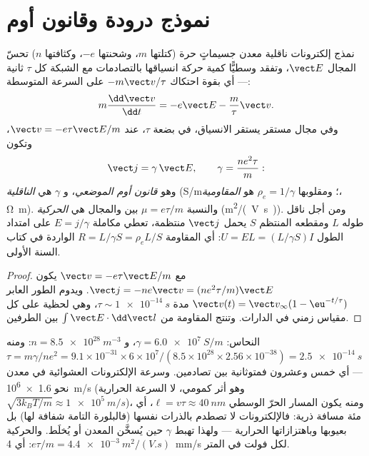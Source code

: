 \section{نموذج درودة وقانون أوم}

\begin{proposition}\label{prop:b2:charges-currents-conduction:drude}
نمذج إلكترونات ناقلية معدن جسيماتٍ حرة (كتلتها $m$،
وشحنتها $-e$، وكثافتها $n$) تحسّ المجال $\vect E$، وتفقد وسطيًّا
كمية حركة انسياقها بالتصادمات مع الشبكة كل $\tau$
ثانية --- أي بقوة احتكاك $-m\vect v/\tau$ على السرعة المتوسطة:
\[
m\frac{\dd\vect v}{\dd t} = -e\vect E - \frac m\tau\vect v .
\]
وفي مجال مستقر يستقر الانسياق، في بضعة $\tau$، عند $\vect v = -e\tau
\vect E/m$، وتكون 
\[
\vect j = \gamma\,\vect E , \qquad \gamma = \frac{ne^2\tau}{m} :
\]
وهو \emph{قانون أوم الموضعي}، و $\gamma$ هي \emph{الناقلية}
(\unit{S/m}؛ ومقلوبها $\rho_e = 1/\gamma$ هو \emph{المقاومية}،
\unit{\ohm.m}). والنسبة $\mu = e\tau/m$ بين  والمجال هي
\emph{الحركية} (\unit{m^2/(V.s)}). ومن أجل ناقل طوله $L$
ومقطعه المنتظم $S$ يحمل $\vect j$ منتظمة، تعطي مكاملة $E = j/\gamma$
على امتداد الطول $U = EL = (L/\gamma S)I$: أي المقاومة $R = L/\gamma S
= \rho_eL/S$ الواردة في كتاب السنة الأولى.
\end{proposition}

\begin{proof}
مع $\vect v = -e\tau\vect E/m$ يكون $\vect j = -ne\vect v = (ne^2\tau/m)\vect E$. ويدوم
الطور العابر $\vect v(t) = \vect v_\infty(1 - \eu^{-t/\tau})$ مدة $\tau \sim
\qty{1e-14}{s}$، وهي لحظية على كل مقياس زمني في الدارات. وتنتج المقاومة
من $\int\vect E\cdot\dd\vect l$ بين الطرفين.
\end{proof}

\begin{example}\label{ex:b2:charges-currents-conduction:copper}
النحاس: $\gamma = \qty{6.0e7}{S/m}$، و $n = \qty{8.5e28}{m^{-3}}$: ومنه $\tau = m\gamma/ne^2 =
9.1 \times 10^{-31} \times 6 \times 10^7/(8.5 \times 10^{28} \times 2.56 \times 10^{-38}) = \qty{2.5e-14}{s}$
--- أي خمس وعشرون فمتوثانية بين تصادمين. وسرعة الإلكترونات
العشوائية في معدن نحو \qty{1.6e6}{m/s} (وهو أثر كمومي، لا
السرعة الحرارية $\sqrt{3k_BT/m} \approx \qty{1e5}{m/s}$)، ومنه يكون المسار الحرّ الوسطي $\ell
= v\tau \approx \qty{40}{nm}$، أي مئة مسافة ذرية: فالإلكترونات لا
تصطدم بالذرات نفسها (فالبلورة التامة شفافة
لها) بل بعيوبها وباهتزازاتها الحرارية --- ولهذا
تهبط $\gamma$ حين يُسخَّن المعدن أو يُخلَط. والحركية $e\tau/m =
\qty{4.4e-3}{m^2/(V.s)}$: أي \qty{4}{mm/s} لكل فولت في المتر.
\end{example}

